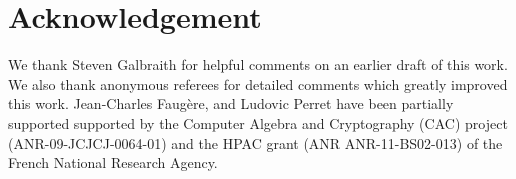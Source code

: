 \documentclass{llncs}[11pt]
\begin{document}
\section*{Acknowledgement}
We thank Steven Galbraith for helpful comments on an earlier draft of this work. We also thank anonymous referees for detailed comments which greatly improved this work. Jean-Charles Faugère, and Ludovic Perret  have been partially supported supported by the Computer Algebra and Cryptography (CAC) project (ANR-09-JCJCJ-0064-01) and the HPAC grant (ANR ANR-11-BS02-013) of the French National Research Agency. 



\end{document}
